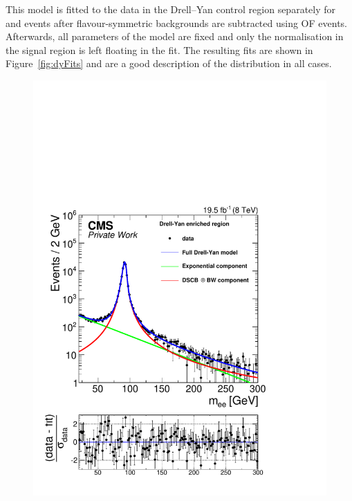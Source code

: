 This model is fitted to the data in the Drell--Yan control region separately for \EE and \MM events after flavour-symmetric backgrounds are subtracted using OF events. Afterwards, all parameters of the model are fixed and only the normalisation in the signal region is left floating in the fit. The resulting fits are shown in Figure~\ref{fig:dyFits} and are a good description of the distribution in all cases. 

\begin{figure}[htbp]
\centering
\begin{minipage}[t]{0.49\textwidth}
  \includegraphics[width=\textwidth]{plots/results/fit/expoFitEE_Log_Central.pdf}
\end{minipage}
\begin{minipage}[t]{0.49\textwidth}

\end{minipage}
\end{figure}
